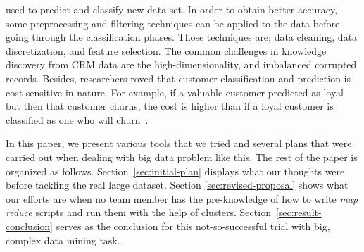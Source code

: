 \documentclass[journal]{IEEEtran}
\begin{document}
used to predict and classify new data set. In order to obtain better
accuracy, some preprocessing and filtering techniques can be applied
to the data before going through the classification phases. Those
techniques are; data cleaning, data discretization, and feature
selection. The common challenges in knowledge discovery from CRM data
are the high-dimensionality, and imbalanced corrupted
records. Besides, researchers roved that customer classification and
prediction is cost sensitive in nature. For example, if a valuable
customer predicted as loyal but then that customer churns, the cost is
higher than if a loyal customer is classified as one who will
churn~\cite{Ref:ChallengesinKDDataMiningDatasets}.
\par
In this paper, we present various tools that we tried and several
plans that were carried out when dealing with big data problem like
this. The rest of the paper is organized as
follows. Section~\ref{sec:initial-plan} displays what our thoughts
were before tackling the real large dataset. Section
\ref{sec:revised-proposal} shows what our efforts are when no team
member has the pre-knowledge of how to write \emph{map reduce} scripts
and run them with the help of
clusters. Section~\ref{sec:result-conclusion} serves as the conclusion
for this not-so-successful trial with big, complex data mining task.

\end{document}
